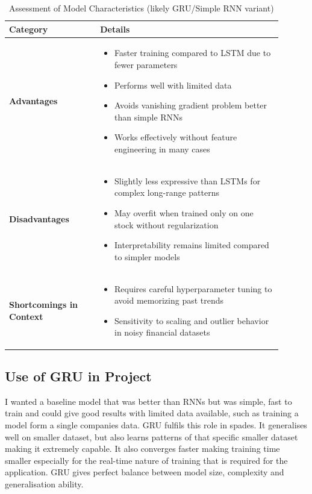 \begin{table}[h]
    \centering
    \begin{tabular}{|p{0.3\linewidth}|p{0.6\linewidth}|}
        \hline
        \textbf{Category} & \textbf{Details} \\
        \hline
        \hline
        \textbf{Advantages} & 
        \begin{itemize}
            \item Faster training compared to LSTM due to fewer parameters
            \item Performs well with limited data
            \item Avoids vanishing gradient problem better than simple RNNs
            \item Works effectively without feature engineering in many cases
        \end{itemize} \\
        \hline
        \textbf{Disadvantages} & 
        \begin{itemize}
            \item Slightly less expressive than LSTMs for complex long-range patterns
            \item May overfit when trained only on one stock without regularization
            \item Interpretability remains limited compared to simpler models
        \end{itemize} \\
        \hline
        \textbf{Shortcomings in Context} & 
        \begin{itemize}
            \item Requires careful hyperparameter tuning to avoid memorizing past trends
            \item Sensitivity to scaling and outlier behavior in noisy financial datasets
        \end{itemize} \\
        \hline
    \end{tabular}
    \caption{Assessment of Model Characteristics (likely GRU/Simple RNN variant)}
    \label{tab:model_assessment}
\end{table}

\subsection{Use of GRU in Project}

I wanted a baseline model that was better than RNNs but was simple, fast to train and could give good results with limited data available, such as training a model form a single companies data. GRU fulfils this role in spades. It generalises well on smaller dataset, but also learns patterns of that specific smaller dataset making it extremely capable. It also converges faster making training time smaller especially for the real-time nature of training that is required for the application. GRU gives perfect balance between model size, complexity and generalisation ability.

